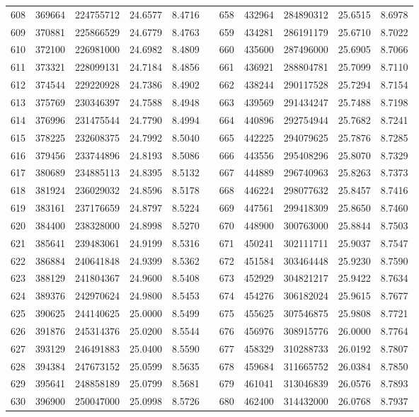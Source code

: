 \begin{longtable}{rrrrrrrrrrr}
608&369664&224755712&24.6577&8.4716&&658&432964&284890312&25.6515&8.6978\\
609&370881&225866529&24.6779&8.4763&&659&434281&286191179&25.6710&8.7022\\
610&372100&226981000&24.6982&8.4809&&660&435600&287496000&25.6905&8.7066\\
611&373321&228099131&24.7184&8.4856&&661&436921&288804781&25.7099&8.7110\\
612&374544&229220928&24.7386&8.4902&&662&438244&290117528&25.7294&8.7154\\
613&375769&230346397&24.7588&8.4948&&663&439569&291434247&25.7488&8.7198\\
614&376996&231475544&24.7790&8.4994&&664&440896&292754944&25.7682&8.7241\\
615&378225&232608375&24.7992&8.5040&&665&442225&294079625&25.7876&8.7285\\
616&379456&233744896&24.8193&8.5086&&666&443556&295408296&25.8070&8.7329\\
617&380689&234885113&24.8395&8.5132&&667&444889&296740963&25.8263&8.7373\\
618&381924&236029032&24.8596&8.5178&&668&446224&298077632&25.8457&8.7416\\
619&383161&237176659&24.8797&8.5224&&669&447561&299418309&25.8650&8.7460\\
620&384400&238328000&24.8998&8.5270&&670&448900&300763000&25.8844&8.7503\\
621&385641&239483061&24.9199&8.5316&&671&450241&302111711&25.9037&8.7547\\
622&386884&240641848&24.9399&8.5362&&672&451584&303464448&25.9230&8.7590\\
623&388129&241804367&24.9600&8.5408&&673&452929&304821217&25.9422&8.7634\\
624&389376&242970624&24.9800&8.5453&&674&454276&306182024&25.9615&8.7677\\
625&390625&244140625&25.0000&8.5499&&675&455625&307546875&25.9808&8.7721\\
626&391876&245314376&25.0200&8.5544&&676&456976&308915776&26.0000&8.7764\\
627&393129&246491883&25.0400&8.5590&&677&458329&310288733&26.0192&8.7807\\
628&394384&247673152&25.0599&8.5635&&678&459684&311665752&26.0384&8.7850\\
629&395641&248858189&25.0799&8.5681&&679&461041&313046839&26.0576&8.7893\\
630&396900&250047000&25.0998&8.5726&&680&462400&314432000&26.0768&8.7937\\

\end{longtable}
